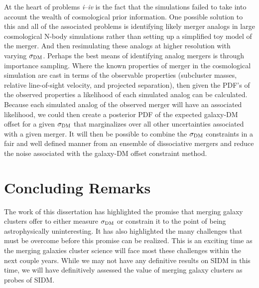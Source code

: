 At the heart of problems \textit{i}--\textit{iv} is the fact that the simulations failed to take into account the wealth of cosmological prior information.
One possible solution to this and all of the associated problems is identifying likely merger analogs in large cosmological N-body simulations rather than setting up a simplified toy model of the merger.
And then resimulating these analogs at higher resolution with varying $\sigma_{\rm DM}$.
Perhaps the best means of identifying analog mergers is through importance sampling. 
Where the known properties of merger in the cosmological simulation are cast in terms of the observable properties (subcluster masses, relative line-of-sight velocity, and projected separation), then given the PDF's of the observed properties a likelihood of each simulated analog can be calculated.
Because each simulated analog of the observed merger will have an associated likelihood, we could then create a posterior PDF of the expected galaxy-DM offset for a given $\sigma_{\rm DM}$ that marginalizes over all other uncertainties associated with a given merger.
It will then be possible to combine the $\sigma_{\rm DM}$ constraints in a fair and well defined manner from an ensemble of dissociative mergers and reduce the noise associated with the galaxy-DM offset constraint method.

\section{Concluding Remarks}

The work of this dissertation has highlighted the promise that merging galaxy clusters offer to either measure $\sigma_{\rm DM}$ or constrain it to the point of being astrophysically uninteresting.
It has also highlighted the many challenges that must be overcome before this promise can be realized.
This is an exciting time as the merging galaxies cluster science will face most these challenges within the next couple years.
While we may not have any definitive results on SIDM in this time, we will have definitively assessed the value of merging galaxy clusters as probes of SIDM.

%



%
%  
